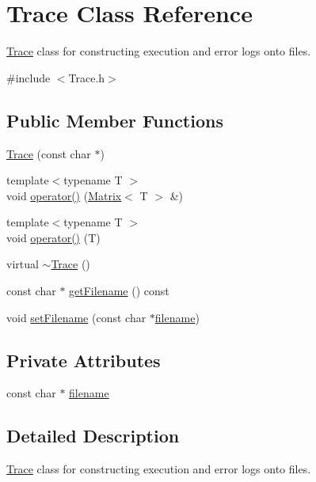 \hypertarget{classTrace}{}\section{Trace Class Reference}
\label{classTrace}


\hyperlink{classTrace}{Trace} class for constructing execution and error logs onto files.  




{\ttfamily \#include $<$Trace.\+h$>$}

\subsection*{Public Member Functions}
\begin{DoxyCompactItemize}
\item 
\hyperlink{classTrace_ae1caa27c33613b7645a212c31d19bc68}{Trace} (const char $\ast$)
\item 
{\footnotesize template$<$typename T $>$ }\\void \hyperlink{classTrace_aa5e57544d11f722c5dda3ad9a4da6029}{operator()} (\hyperlink{singletonMatrix}{Matrix}$<$ T $>$ \&)
\item 
{\footnotesize template$<$typename T $>$ }\\void \hyperlink{classTrace_af4414b9f6dc073e3f1244ac588b70480}{operator()} (T)
\item 
virtual \hyperlink{classTrace_a39492ecec74969a4905ec5fcf026dc09}{$\sim$\+Trace} ()
\item 
const char $\ast$ \hyperlink{classTrace_afd809a7f04af6e63e65c428409606927}{get\+Filename} () const 
\item 
void \hyperlink{classTrace_a4d8dff9586721e94d2bee132b0739a31}{set\+Filename} (const char $\ast$\hyperlink{classTrace_a0d9910fe66882cafb9617563b397a7b4}{filename})
\end{DoxyCompactItemize}
\subsection*{Private Attributes}
\begin{DoxyCompactItemize}
\item 
const char $\ast$ \hyperlink{classTrace_a0d9910fe66882cafb9617563b397a7b4}{filename}
\end{DoxyCompactItemize}


\subsection{Detailed Description}
\hyperlink{classTrace}{Trace} class for constructing execution and error logs onto files. 

